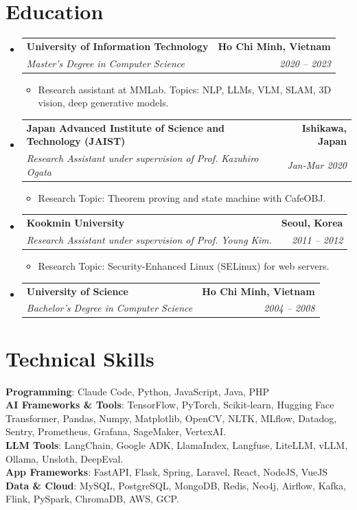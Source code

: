 \documentclass[letterpaper,11pt]{article}
\makeatletter
\newcommand{\resumeItem}[1]{
  \item\small{
    {#1 \vspace{-2pt}}
  }
}
\newcommand{\resumeSubheading}[4]{
  \vspace{-2pt}\item
    \begin{tabular*}{1.0\textwidth}[t]{l@{\extracolsep{\fill}}r}
      \textbf{#1} & \textbf{\small #2} \\
      \textit{\small#3} & \textit{\small #4} \\
    \end{tabular*}\vspace{-7pt}
}
\newcommand{\resumeSubHeadingListStart}{\begin{itemize}[leftmargin=0.0in, label={}]}
\newcommand{\resumeSubHeadingListEnd}{\end{itemize}}
\newcommand{\resumeItemListStart}{\begin{itemize}}
\newcommand{\resumeItemListEnd}{\end{itemize}\vspace{-5pt}}
\makeatother
\begin{document}
\section{Education}
  \resumeSubHeadingListStart
    \resumeSubheading
      {University of Information Technology}{Ho Chi Minh, Vietnam}
      {Master's Degree in Computer Science}{2020 -- 2023}
        \resumeItemListStart
            \resumeItem{Research assistant at MMLab. Topics: NLP, LLMs, VLM, SLAM, 3D vision, deep
generative models.}
      \resumeItemListEnd
    \resumeSubheading
      {Japan Advanced Institute of Science and Technology (JAIST)}{Ishikawa, Japan}
      {Research Assistant under supervision of Prof. Kazuhiro Ogata}{Jan-Mar 2020}
          \resumeItemListStart
            \resumeItem{Research Topic: Theorem proving and state machine with CafeOBJ.}
        \resumeItemListEnd

    \resumeSubheading
      {Kookmin University}{Seoul, Korea}
      {Research Assistant under supervision of Prof. Young Kim.}{2011 -- 2012}
        \resumeItemListStart
            \resumeItem{Research Topic: Security-Enhanced Linux (SELinux) for web servers.}
        \resumeItemListEnd

    \resumeSubheading
          {University of Science}{Ho Chi Minh, Vietnam}
          {Bachelor's Degree in Computer Science}{2004 -- 2008}

      \resumeSubHeadingListEnd

\section{Technical Skills}
 \begin{itemize}[leftmargin=0.15in, label={}]
    \small{\item{
     \textbf{Programming}{: Claude Code, Python, JavaScript, Java, PHP} \\
     \textbf{AI Frameworks \& Tools}{: TensorFlow, PyTorch, Scikit-learn, Hugging Face Transformer, Pandas, Numpy, Matplotlib, OpenCV, NLTK, MLflow, Datadog, Sentry, Prometheus, Grafana, SageMaker, VertexAI.} \\
     \textbf{LLM Tools}{: LangChain, Google ADK, LlamaIndex, Langfuse, LiteLLM, vLLM, Ollama, Unsloth, DeepEval.} \\
     \textbf{App Frameworks}{: FastAPI, Flask, Spring, Laravel, React, NodeJS, VueJS} \\
     \textbf{Data \& Cloud}{: MySQL, PostgreSQL, MongoDB, Redis, Neo4j, Airflow, Kafka, Flink, PySpark, ChromaDB, AWS, GCP.} \\
    }}
 \end{itemize}
\end{document}
